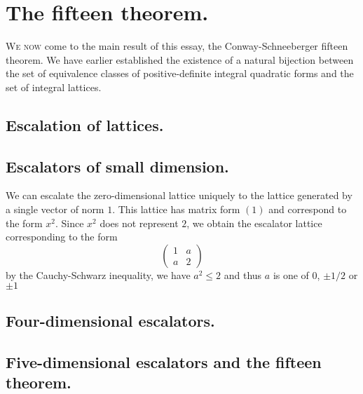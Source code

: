 \chapter{The fifteen theorem.}
\label{chap:conway-schneeberger}

{\scshape We now} come to the main result of this essay, the Conway-Schneeberger
fifteen theorem. We have earlier established the existence of a natural
bijection between the set of equivalence classes of positive-definite integral
quadratic forms and the set of integral lattices.

\section{Escalation of lattices.}


\section{Escalators of small dimension.}

We can escalate the zero-dimensional lattice uniquely to the lattice generated
by a single vector of norm \(1\). This lattice has matrix form \((1)\) and
correspond to the form \(x^2\). Since \(x^2\) does not represent \(2\), we
obtain the escalator lattice corresponding to the form
\[
    \begin{pmatrix}
        1 & a \\
        a & 2
    \end{pmatrix}  
\]
by the Cauchy-Schwarz inequality, we have \(a^2 \leq 2\) and thus \(a\) is one
of \(0\), \(\pm 1/2\) or \(\pm 1\)

\section{Four-dimensional escalators.}

\section{Five-dimensional escalators and the fifteen theorem.}